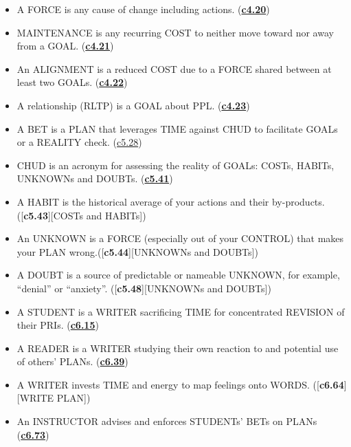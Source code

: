 \documentclass[
]{book}
\begin{document}
\begin{itemize}
\item
  A FORCE is any cause of change including actions. (\protect\hyperlink{work}{\textbf{c4.20}})\\
\item
  MAINTENANCE is any recurring COST to neither move toward nor away from a GOAL. (\protect\hyperlink{work}{\textbf{c4.21}})\\
\item
  An ALIGNMENT is a reduced COST due to a FORCE shared between at least two GOALs. (\protect\hyperlink{work}{\textbf{c4.22}})\\
\item
  A relationship (RLTP) is a GOAL about PPL. (\protect\hyperlink{work}{\textbf{c4.23}})\\
\item
  A BET is a PLAN that leverages TIME against CHUD to facilitate GOALs or a REALITY check. (\protect\hyperlink{word-bet}{c5.28})\\
\item
  CHUD is an acronym for assessing the reality of GOALs: COSTs, HABITs, UNKNOWNs and DOUBTs. (\protect\hyperlink{c.h.u.d.}{\textbf{c5.41}})\\
\item
  A HABIT is the historical average of your actions and their by-products.({[}\textbf{c5.43}{]}{[}COSTs and HABITs{]})\\
\item
  An UNKNOWN is a FORCE (especially out of your CONTROL) that makes your PLAN wrong.({[}\textbf{c5.44}{]}{[}UNKNOWNs and DOUBTs{]})\\
\item
  A DOUBT is a source of predictable or nameable UNKNOWN, for example, ``denial'' or ``anxiety''. ({[}\textbf{c5.48}{]}{[}UNKNOWNs and DOUBTs{]})\\
\item
  A STUDENT is a WRITER sacrificing TIME for concentrated REVISION of their PRIs. (\protect\hyperlink{student}{\textbf{c6.15}})\\
\item
  A READER is a WRITER studying their own reaction to and potential use of others' PLANs. (\protect\hyperlink{word-read}{\textbf{c6.39}})\\
\item
  A WRITER invests TIME and energy to map feelings onto WORDS. ({[}\textbf{c6.64}{]}{[}WRITE PLAN{]})\\
\item
  An INSTRUCTOR advises and enforces STUDENTs' BETs on PLANs (\protect\hyperlink{instructor}{\textbf{c6.73}})\\

\end{itemize}
\end{document}
